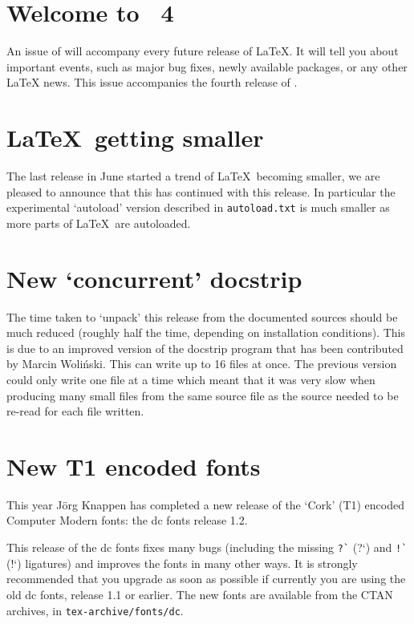 \documentclass{ltnews}
\providecommand\file[1]{\texttt{#1}}
\begin{document}
\maketitle

\section{Welcome to \LaTeXNews~4}

An issue of \emph{\LaTeXNews} will accompany every future release of
\LaTeX.  It will tell you about important events, such as major bug
fixes, newly available packages, or any other \LaTeX{} news.
This issue accompanies the fourth release of \LaTeXe.


\section{\LaTeX\ getting smaller}

The last release in June started a trend of \LaTeX\ becoming
smaller, we are pleased to announce that this has continued with this
release. In particular the experimental `autoload' version described in
\file{autoload.txt} is much smaller as more parts of \LaTeX\ are
autoloaded.

\section{New `concurrent' docstrip}

The time taken to `unpack' this release from the documented sources
should be much reduced (roughly half the time, depending on
installation conditions). This is due to an improved version of the
docstrip program that has been contributed by Marcin Woli\'nski.
This can write up to 16 files at once. The
previous version could only write one file at a time which meant that
it was very slow when producing many small files from the same source
file as the source needed to be re-read for each file written.

\section{New T1 encoded fonts}

This year J\"org Knappen has completed a new release of the `Cork'
(T1) encoded Computer Modern fonts: the dc fonts release 1.2.

This release of the dc fonts fixes many bugs (including the missing
\verb|?`| (?`) and \verb|!`| (!`) ligatures) and improves the fonts in
many other ways. It is strongly recommended that you upgrade as soon as
possible if currently you are using the old dc fonts, release 1.1 or
earlier. The new fonts are available from the CTAN archives, in
\file{tex-archive/fonts/dc}.
\end{document}
